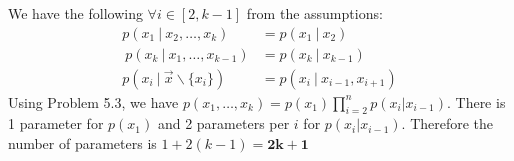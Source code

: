 \newcommand{\CI}{\mathrel{\perp\mkern-10mu\perp}}
\newcommand{\given}{~\vert~}
\newcommand{\CondInd}[3]{(#1 \CI #2 \given #3)}
We have the following $\forall i \in [2, k-1]$ from the assumptions:
\begin{align*}
    p(x_1 \given x_2, \dots, x_k) &= p(x_1 \given x_2)\\\
    p(x_k \given x_1, \dots, x_{k-1}) &= p(x_k \given x_{k-1}) \\
    p(x_i \given \vec{x}\backslash\{x_i\}) &= p(x_i \given x_{i-1}, x_{i+1})
\end{align*}
Using Problem 5.3, we have $p(x_1, \dots, x_k) = p(x_1) \displaystyle\prod_{i=2}^n p(x_i | x_{i-1})$. There is 1 parameter for $p(x_1)$ and 2 parameters per $i$ for $p(x_i | x_{i-1})$. Therefore the number of parameters is $1 + 2(k-1) = \mathbf{2k+1}$

